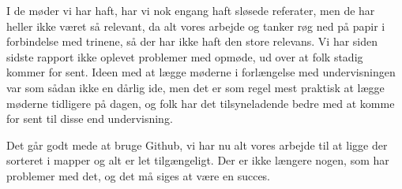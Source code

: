 \documentclass[10pt,a4paper,danish]{article}
\begin{document}
I de møder vi har haft, har vi nok engang haft sløsede referater, men de har
heller ikke været så relevant, da alt vores arbejde og tanker røg ned på papir
i forbindelse med trinene, så der har ikke haft den store relevans. Vi har
siden sidste rapport ikke oplevet problemer med opmøde, ud over at folk stadig
kommer for sent. Ideen med at lægge møderne i forlængelse med undervisningen
var som sådan ikke en dårlig ide, men det er som regel mest praktisk at lægge
møderne tidligere på dagen, og folk har det tilsyneladende bedre med at komme
for sent til disse end undervisning. 

Det går godt mede at bruge Github, vi har nu alt vores arbejde til at ligge der
sorteret i mapper og alt er let tilgængeligt. Der er ikke længere nogen, som
har problemer med det, og det må siges at være en succes.
\end{document}
